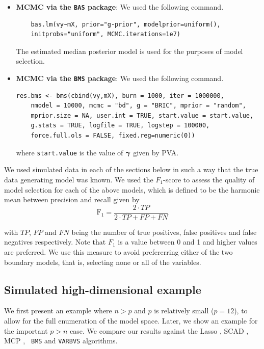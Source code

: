 \begin{itemize}
	\item {\bf MCMC via the {\tt BAS} package}: We used the following command.
	\begin{verbatim}
	bas.lm(vy~mX, prior="g-prior", modelprior=uniform(), 
    initprobs="uniform", MCMC.iterations=1e7)
	\end{verbatim}
	
	\noindent 
    The estimated median posterior model is used for the purposes of model
    selection.
    
    \item {\bf MCMC via the {\tt BMS} package}: We used the following command.
    \begin{verbatim}
res.bms <- bms(cbind(vy,mX), burn = 1000, iter = 1000000, 
    nmodel = 10000, mcmc = "bd", g = "BRIC", mprior = "random", 
    mprior.size = NA, user.int = TRUE, start.value = start.value, 
    g.stats = TRUE, logfile = TRUE, logstep = 100000, 
    force.full.ols = FALSE, fixed.reg=numeric(0))	
    \end{verbatim}
    
	where {\tt start.value} is the value of ${\boldsymbol \gamma}$ given by PVA.
\end{itemize}

We used simulated data in each of the sections below in such a way that the
true data generating model was known. We used the $F_1$-score
\citep[see][]{Van_Rijsbergen1979} to assess the quality of model selection for
each of the above models, which is defined to be the harmonic mean between
precision and recall given by
$$
\mbox{F}_1 = \frac{2\cdot TP}{2\cdot TP + FP + FN}
$$

\noindent with $TP$, $FP$ and $FN$ being the number of true positives, false
positives and false negatives respectively. Note that $F_1$ is a value between
0 and 1 and higher values are preferred. We use this measure to avoid
prefererring either of the two boundary models, that is, selecting none or all
of the variables. 

\subsection{Simulated high-dimensional example}
\label{sec:highdimensional} 

We first present an example  where $n > p$ and $p$ is relatively small ($p =
12$), to allow for the full enumeration of the model space. Later, we show an
example for the important $p > n$ case. We compare our results  against the
Lasso \citep{Tibshirani1996}, SCAD \citep{Fan2001}, MCP \citep{Zhang2010}, {\tt
BMS} \citep{Zeugner2015} and {\tt VARBVS} \citep{Carbonetto2011} algorithms.

